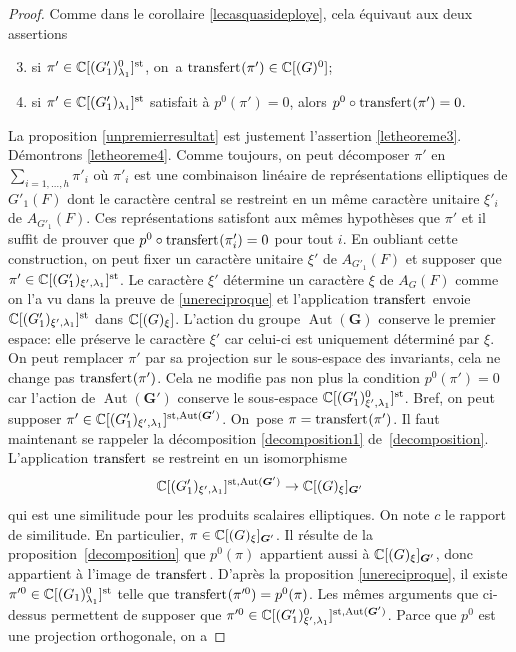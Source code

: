 \documentclass[11pt]{article}
\numberwithin{equation}{section}\providecommand{\og}{«\,}\providecommand{\fg}{\,»}
\newcommand{\NoChangel}[1]{%
\expandafter\let\csname old\string#1\endcsname=#1
\let#1=\relax
\newcommand{#1}{\mathcode`l="716C\csname old\string#1\endcsname\mathcode`l="7160 }%
}
\newcommand{\rell}{\mathrm{ell}} \NoChangel{\rell}
\newcommand{\Ell}{\mathrm{Ell}} \NoChangel{\Ell}
\newcommand{\st}{\mathrm{st}}
\DeclareMathOperator{\Aut}{Aut}
\DeclareMathOperator{\transfert}{transfert}
\newcommand{\bG}{\boldsymbol{G}}
\newcommand{\CC}{\mathbb{C}}
\theoremstyle{plain}
\theoremstyle{definition}
\begin{document}
\begin{proof}
Comme dans le corollaire \ref{lecasquasideploye}, cela équivaut aux deux assertions
\begin{enumerate}\setcounter{enumi}{2}
\item\label{letheoreme3}
si $\pi'\in \CC[\Ell(G'_{1})_{\lambda_{1}}^0]^{\st}$, on~a $\transfert_{\rell}(\pi')\in \CC[\Ell(G)^0]$;

\item\label{letheoreme4}
si $\pi'\in \CC[\Ell(G'_{1})_{\lambda_{1}}]^{\st}$ satisfait à $p^0(\pi')=0$, alors $p^0\circ \transfert_{\rell}(\pi')=0$.
\end{enumerate}

La proposition \ref{unpremierresultat} est justement l'assertion \eqref{letheoreme3}. Démontrons \eqref{letheoreme4}. Comme toujours, on peut décomposer $\pi'$ en $\sum_{i=1,\dots,h}\pi'_{i}$ où $\pi'_{i}$ est une combinaison linéaire de représentations elliptiques de $G'_{1}(F)$ dont le caractère central se restreint en un même caractère unitaire $\xi'_{i}$ de $A_{G'_{1}}(F)$. Ces représentations satisfont aux mêmes hypothèses que $\pi'$ et il suffit de prouver que $p^0\circ \transfert_{\rell}(\pi'_{i})=0$ pour tout $i$. En oubliant cette construction, on peut fixer un caractère unitaire $\xi'$ de $A_{G'_{1}}(F)$ et supposer que $\pi'\in \CC[\Ell(G'_{1})_{\xi',\lambda_{1}}]^{\st}$. Le caractère $\xi'$ détermine un caractère $\xi$ de $A_{G}(F)$ comme on l'a vu dans la preuve de \ref{unereciproque} et l'application $\transfert_{\rell}$ envoie $\CC[\Ell(G'_{1})_{\xi',\lambda_{1}}]^{\st}$ dans $\CC[\Ell(G)_{\xi}]$. L'action du groupe $\Aut(\bG)$ conserve le premier espace: elle préserve le caractère $\xi'$ car celui-ci est uniquement déterminé par $\xi$. On peut remplacer $\pi'$ par sa projection sur le sous-espace des invariants, cela ne change pas $\transfert_{\rell}(\pi')$. Cela ne modifie pas non plus la condition $p^0(\pi')=0$ car l'action de $\Aut(\bG')$ conserve le sous-espace $\CC[\Ell(G'_{1})^0_{\xi',\lambda_{1}}]^{\st}$. Bref, on peut supposer $\pi'\in \CC[\Ell(G'_{1})_{\xi',\lambda_{1}}]^{\st,\Aut(\bG')}$. On~pose $\pi=\transfert_{\rell}(\pi')$. Il faut maintenant se rappeler la décomposition \eqref{decomposition1} de~\ref{decomposition}. L'application $\transfert_{\rell}$ se restreint en un isomorphisme
\[
\CC[\Ell(G'_{1})_{\xi',\lambda_{1}}]^{\st,\Aut(\bG')}\to \CC[\Ell(G)_{\xi}]_{\bG'}
\]
qui est une similitude pour les produits scalaires elliptiques. On note $c$ le rapport de similitude. En particulier, $\pi\in \CC[\Ell(G)_{\xi}]_{\bG'}$. Il résulte de la proposition~\ref{decomposition} que $p^0(\pi)$ appartient aussi à $\CC[\Ell(G)_{\xi}]_{\bG'}$, donc appartient à l'image de $\transfert_{\rell}$. D'après la proposition \ref{unereciproque}, il existe $\pi^{\prime0}\in \CC[\Ell(G_{1})^0_{\lambda_{1}}]^{\st}$ telle que $\transfert_{\rell}(\pi^{\prime0})=p^0(\pi)$. Les mêmes arguments que ci-dessus permettent de supposer que $\pi^{\prime0}\in \CC[\Ell(G'_{1})^0_{\xi',\lambda_{1}}]^{\st,\Aut(\bG')}$. Parce que $p^0$ est une projection orthogonale, on a

\end{proof}
\end{document}
